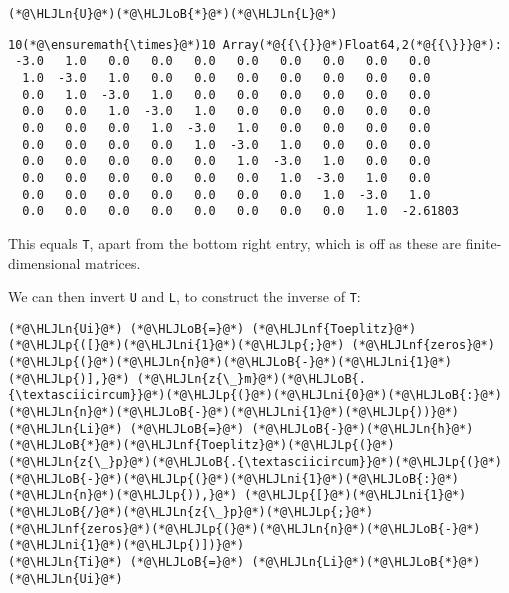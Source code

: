 \documentclass[12pt,a4paper]{article}
\newcommand{\HLJLn}[1]{#1}
\newcommand{\HLJLnf}[1]{\textcolor[RGB]{66,102,213}{#1}}
\newcommand{\HLJLni}[1]{\textcolor[RGB]{59,151,46}{#1}}
\newcommand{\HLJLoB}[1]{\textcolor[RGB]{102,102,102}{\textbf{#1}}}
\newcommand{\HLJLp}[1]{#1}
\begin{document}
\begin{lstlisting}
(*@\HLJLn{U}@*)(*@\HLJLoB{*}@*)(*@\HLJLn{L}@*)
\end{lstlisting}

\begin{lstlisting}
10(*@\ensuremath{\times}@*)10 Array(*@{{\{}}@*)Float64,2(*@{{\}}}@*):
 -3.0   1.0   0.0   0.0   0.0   0.0   0.0   0.0   0.0   0.0    
  1.0  -3.0   1.0   0.0   0.0   0.0   0.0   0.0   0.0   0.0    
  0.0   1.0  -3.0   1.0   0.0   0.0   0.0   0.0   0.0   0.0    
  0.0   0.0   1.0  -3.0   1.0   0.0   0.0   0.0   0.0   0.0    
  0.0   0.0   0.0   1.0  -3.0   1.0   0.0   0.0   0.0   0.0    
  0.0   0.0   0.0   0.0   1.0  -3.0   1.0   0.0   0.0   0.0    
  0.0   0.0   0.0   0.0   0.0   1.0  -3.0   1.0   0.0   0.0    
  0.0   0.0   0.0   0.0   0.0   0.0   1.0  -3.0   1.0   0.0    
  0.0   0.0   0.0   0.0   0.0   0.0   0.0   1.0  -3.0   1.0    
  0.0   0.0   0.0   0.0   0.0   0.0   0.0   0.0   1.0  -2.61803
\end{lstlisting}


This equals \texttt{T}, apart from the bottom right entry, which is off as these are finite-dimensional matrices. 

We can then invert \texttt{U} and \texttt{L}, to construct the inverse of \texttt{T}:


\begin{lstlisting}
(*@\HLJLn{Ui}@*) (*@\HLJLoB{=}@*) (*@\HLJLnf{Toeplitz}@*)(*@\HLJLp{([}@*)(*@\HLJLni{1}@*)(*@\HLJLp{;}@*) (*@\HLJLnf{zeros}@*)(*@\HLJLp{(}@*)(*@\HLJLn{n}@*)(*@\HLJLoB{-}@*)(*@\HLJLni{1}@*)(*@\HLJLp{)],}@*) (*@\HLJLn{z{\_}m}@*)(*@\HLJLoB{.{\textasciicircum}}@*)(*@\HLJLp{(}@*)(*@\HLJLni{0}@*)(*@\HLJLoB{:}@*)(*@\HLJLn{n}@*)(*@\HLJLoB{-}@*)(*@\HLJLni{1}@*)(*@\HLJLp{))}@*)
(*@\HLJLn{Li}@*) (*@\HLJLoB{=}@*) (*@\HLJLoB{-}@*)(*@\HLJLn{h}@*)(*@\HLJLoB{*}@*)(*@\HLJLnf{Toeplitz}@*)(*@\HLJLp{(}@*)(*@\HLJLn{z{\_}p}@*)(*@\HLJLoB{.{\textasciicircum}}@*)(*@\HLJLp{(}@*)(*@\HLJLoB{-}@*)(*@\HLJLp{(}@*)(*@\HLJLni{1}@*)(*@\HLJLoB{:}@*)(*@\HLJLn{n}@*)(*@\HLJLp{)),}@*) (*@\HLJLp{[}@*)(*@\HLJLni{1}@*)(*@\HLJLoB{/}@*)(*@\HLJLn{z{\_}p}@*)(*@\HLJLp{;}@*) (*@\HLJLnf{zeros}@*)(*@\HLJLp{(}@*)(*@\HLJLn{n}@*)(*@\HLJLoB{-}@*)(*@\HLJLni{1}@*)(*@\HLJLp{)])}@*)
(*@\HLJLn{Ti}@*) (*@\HLJLoB{=}@*) (*@\HLJLn{Li}@*)(*@\HLJLoB{*}@*)(*@\HLJLn{Ui}@*)
\end{lstlisting}
\end{document}
